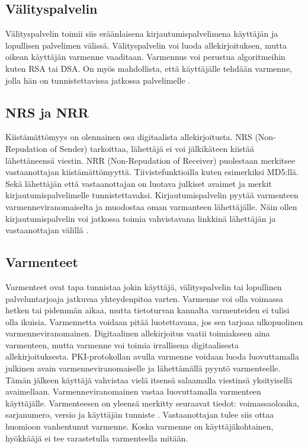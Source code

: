 \documentclass[finnish]{tktltiki2}
\theoremstyle{definition}
\theoremstyle{remark}
\begin{document}
\subsection{Välityspalvelin}

Välityspalvelin toimii siis eräänlaisena kirjautumispalvelimena käyttäjän ja lopullisen palvelimen välissä. Välityspalvelin voi luoda allekirjoituksen, mutta oikean käyttäjän varmenne vaaditaan. Varmennus voi perustua algoritmeihin kuten RSA tai DSA. On myös mahdollista, että käyttäjälle tehdään varmenne, jolla hän on tunnistettavissa jatkossa palvelimelle \cite{proxy}.

\subsection{NRS ja NRR}

Kiistämättömyys on olennainen osa digitaalista allekirjoitusta. NRS (Non-Repudation of Sender) tarkoittaa, lähettäjä ei voi jälkikäteen kiistää lähettäneensä viestin. NRR (Non-Repudation of Receiver) puolestaan merkitsee vastaanottajan kiistämättömyyttä. Tiivistefunktioilla kuten esimerkiksi MD5:llä. Sekä lähettäjän että vastaanottajan on luotava julkiset avaimet ja merkit kirjautumispalvelimelle tunnistettavaksi. Kirjautumispalvelin pyytää varmenteen varmenneviranomaiselta ja muodostaa oman varmanteen lähettäjälle. Näin ollen kirjautumispalvelin voi jatkossa toimia vahvistavana linkkinä lähettäjän ja vastaanottajan välillä \cite{gene}.


\subsection{Varmenteet}

Varmenteet ovat tapa tunnistaa jokin käyttäjä, välityspalvelin tai lopullinen palveluntarjoaja jatkuvaa yhteydenpitoa varten. Varmenne voi olla voimassa hetken tai pidemmän aikaa, mutta tietoturvan kannalta varmenteiden ei tulisi olla ikuisia. Varmennetta voidaan pitää luotettavana, jos sen tarjoaa ulkopuolinen varmenneviranomainen. Digitaalinen allekirjoitus vaatii toimiakseen aina varmenteen, mutta varmenne voi toimia irrallisena digitaalisesta allekirjoituksesta. PKI-protokollan avulla varmenne voidaan luoda luovuttamalla julkinen avain varmenneviranomaiselle ja lähettämällä pyyntö varmenteelle. Tämän jälkeen käyttäjä vahvistaa vielä itsensä salaamalla viestinsä yksityisellä avaimellaan. Varmenneviranomainen vastaa luovuttamalla varmenteen käyttäjälle. Varmenteesen on yleensä merkitty seuraavat tiedot: voimassaoloaika, sarjanumero, versio ja käyttäjän tunniste \cite{ECC}. Vastaanottajan tulee siis ottaa huomioon vanhentunut varmenne. Koska varmenne on käyttäjäkohtainen, hyökkääjä ei tee varastetulla varmenteella mitään. 
\end{document}
